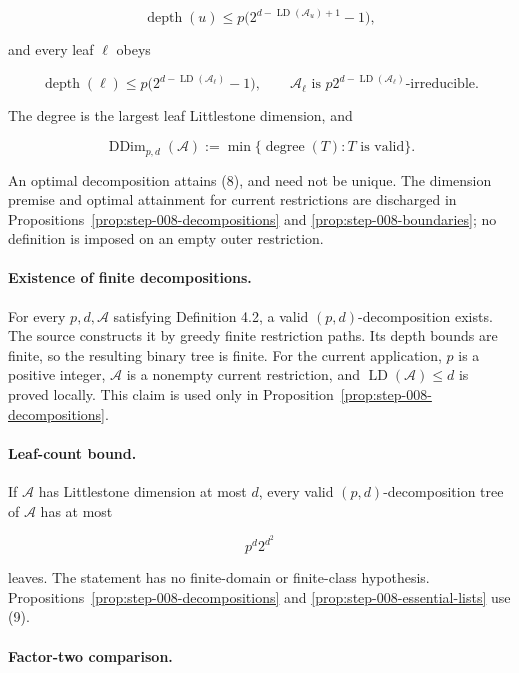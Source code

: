 \[
 \operatorname{depth}(u)
 \le p\bigl(2^{d-\operatorname{LD}(\mathcal A_u)+1}-1\bigr),
\tag{6}
\]

and every leaf \(\ell\) obeys

\[
 \operatorname{depth}(\ell)
 \le p\bigl(2^{d-\operatorname{LD}(\mathcal A_\ell)}-1\bigr),
 \qquad
 \mathcal A_\ell\text{ is }
 p2^{d-\operatorname{LD}(\mathcal A_\ell)}
 \text{-irreducible}.
\tag{7}
\]

The degree is the largest leaf Littlestone dimension, and

\[
 \operatorname{DDim}_{p,d}(\mathcal A)
 :=\min\{\operatorname{degree}(T):T\text{ is valid}\}.
\tag{8}
\]

An optimal decomposition attains (8), and need not be unique. The
dimension premise and optimal attainment for current restrictions are
discharged in Propositions~\ref{prop:step-008-decompositions} and
\ref{prop:step-008-boundaries}; no definition is imposed on an empty outer
restriction.

\paragraph{Existence of finite decompositions.}

For every \(p,d,\mathcal A\) satisfying Definition 4.2, a valid
\((p,d)\)-decomposition exists. The source constructs it by greedy finite
restriction paths. Its depth bounds are finite, so the resulting binary
tree is finite. For the current application, \(p\) is a positive integer,
\(\mathcal A\) is a nonempty current restriction, and
\(\operatorname{LD}(\mathcal A)\le d\) is proved locally. This claim is
used only in Proposition~\ref{prop:step-008-decompositions}.

\paragraph{Leaf-count bound.}

If \(\mathcal A\) has Littlestone dimension at most \(d\), every valid
\((p,d)\)-decomposition tree of \(\mathcal A\) has at most

\[
 p^d2^{d^2}
\tag{9}
\]

leaves. The statement has no finite-domain or finite-class hypothesis.
Propositions~\ref{prop:step-008-decompositions} and
\ref{prop:step-008-essential-lists} use (9).

\paragraph{Factor-two comparison.}


